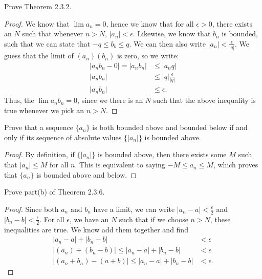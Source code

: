 \documentclass[12pt]{book}
\newenvironment{exercise}[2][Exercise]{\begin{trivlist}
\item[\hskip \labelsep {\bfseries #1}\hskip \labelsep {\bfseries #2.}]}{\end{trivlist}}
\begin{document}
\begin{exercise}{2.3.5}
Prove Theorem 2.3.2.

	\begin{proof}
	We know that $\lim a_n = 0$, hence we know that for all $\epsilon > 0$, there exists an $N$ such that whenever $n>N$, $|a_n | < \epsilon$. Likewise, we know that $b_n$ is bounded, such that we can state that $- q \leq b_b \leq q$. We can then also write $|a_n| < \frac{\epsilon}{|q|}$.  We guess that the limit of $ (a_n)(b_n)$ is zero, so we write:
		\begin{align*}
		|a_n b_n - 0| = |a_n b_n| &\leq | a_n q| \\
		|a_n b_n| &\leq |q| \frac{\epsilon}{|q|}  \\
		|a_n b_n| &\leq \epsilon.
		\end{align*}
	Thus, the $\lim a_n b_n = 0$, since we there is an $N$ such that the above inequality is true whenever we pick an $n>N$.
	\end{proof}
\end{exercise}


\begin{exercise}{2.3.6}
Prove that a sequence $\{a_n\}$ is both bounded above and bounded below if and only if its sequence of absolute values $\{|a_n|\}$ is bounded above.

\begin{proof}
By definition, if $\{|a_n|\}$ is bounded above, then there exists some $M$ such that $|a_n| \leq M$ for all $n$. This is equivalent to saying $-M \leq a_n \leq M$, which proves that $\{a_n\}$ is bounded above and below.
\end{proof}
\end{exercise}


\begin{exercise}{2.3.7}
Prove part(b) of Theorem 2.3.6.

\begin{proof}
	Since both $a_n$ and $b_n$ have a limit, we can write $|a_n -a| < \frac{\epsilon}{2}$ and $|b_n - b| < \frac{\epsilon}{2}$. For all $\epsilon$, we have an $N$ such that if we choose $n>N$, these inequalities are true. We know add them together and find
	\begin{align*}
	|a_n - a| + |b_n - b| &< \epsilon \\
	|(a_n) + (b_n -b) | \leq |a_n - a| + |b_n - b| &< \epsilon \\
	|(a_n + b_n) - (a+b) | \leq |a_n - a| + |b_n - b| &< \epsilon.
	\end{align*}
\end{proof}
\end{exercise}
\end{document}
